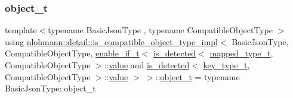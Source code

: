 \subsubsection{\texorpdfstring{object\_t}{object\_t}}
{\footnotesize\ttfamily template$<$typename Basic\+Json\+Type , typename Compatible\+Object\+Type $>$ \\
using \mbox{\hyperlink{structnlohmann_1_1detail_1_1is__compatible__object__type__impl}{nlohmann\+::detail\+::is\+\_\+compatible\+\_\+object\+\_\+type\+\_\+impl}}$<$ Basic\+Json\+Type, Compatible\+Object\+Type, \mbox{\hyperlink{namespacenlohmann_1_1detail_a02bcbc878bee413f25b985ada771aa9c}{enable\+\_\+if\+\_\+t}}$<$ \mbox{\hyperlink{namespacenlohmann_1_1detail_a9135fcf616d6ac6e231a86e0a055ac44}{is\+\_\+detected}}$<$ \mbox{\hyperlink{namespacenlohmann_1_1detail_a9c1795c148875722f8482d39e0eb9364}{mapped\+\_\+type\+\_\+t}}, Compatible\+Object\+Type $>$\+::\mbox{\hyperlink{structnlohmann_1_1detail_1_1is__compatible__object__type__impl_3_01_basic_json_type_00_01_compatfbe9a153c4ecce445c98bbdd2d65f605_adc8188ae8d65e8175d961cd461a8ee43}{value}} and \mbox{\hyperlink{namespacenlohmann_1_1detail_a9135fcf616d6ac6e231a86e0a055ac44}{is\+\_\+detected}}$<$ \mbox{\hyperlink{namespacenlohmann_1_1detail_a66dfe39f03b05d6b7265a0ff748d64ef}{key\+\_\+type\+\_\+t}}, Compatible\+Object\+Type $>$\+::\mbox{\hyperlink{structnlohmann_1_1detail_1_1is__compatible__object__type__impl_3_01_basic_json_type_00_01_compatfbe9a153c4ecce445c98bbdd2d65f605_adc8188ae8d65e8175d961cd461a8ee43}{value}} $>$ $>$\+::\mbox{\hyperlink{structnlohmann_1_1detail_1_1is__compatible__object__type__impl_3_01_basic_json_type_00_01_compatfbe9a153c4ecce445c98bbdd2d65f605_a551e9ee372c1b24b632e6b668c231a62}{object\+\_\+t}} =  typename Basic\+Json\+Type\+::object\+\_\+t}



